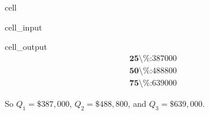 \documentclass[letterpaper,10pt,english]{jupyterBook}
\begin{document}
\begin{sphinxuseclass}{cell}\begin{sphinxVerbatimInput}

\begin{sphinxuseclass}{cell_input}
\begin{sphinxVerbatim}[commandchars=\\\{\}]



\end{sphinxVerbatim}

\end{sphinxuseclass}\end{sphinxVerbatimInput}
\begin{sphinxVerbatimOutput}

\begin{sphinxuseclass}{cell_output}\begin{equation*}
\begin{split}\textbf{25\textbackslash{}\%:} 387000\end{split}
\end{equation*}\begin{equation*}
\begin{split}\textbf{50\textbackslash{}\%:} 488800\end{split}
\end{equation*}\begin{equation*}
\begin{split}\textbf{75\textbackslash{}\%:} 639000\end{split}
\end{equation*}
\end{sphinxuseclass}\end{sphinxVerbatimOutput}

\end{sphinxuseclass}
\sphinxAtStartPar
So \(Q_1 = \$387,000\), \(Q_2 = \$488,800\), and \(Q_3 = \$639,000\).
\end{document}
